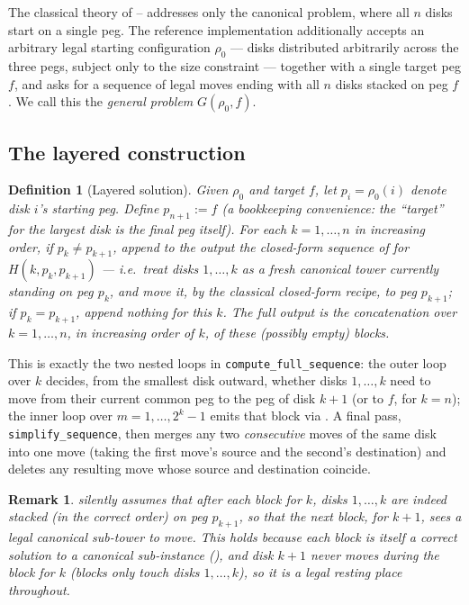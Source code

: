 \documentclass[11pt]{article}
\newtheorem{definition}[theorem]{Definition}
\newtheorem{remark}[theorem]{Remark}
\begin{document}
The classical theory of -- addresses only
the canonical problem, where all $n$ disks start on a single peg. The
reference implementation additionally accepts an arbitrary legal starting
configuration $\rho_0$ --- disks distributed arbitrarily across the three
pegs, subject only to the size constraint --- together with a single target
peg $f$, and asks for a sequence of legal moves ending with all $n$ disks
stacked on peg $f$. We call this the \emph{general problem}
$G(\rho_0, f)$.

\subsection{The layered construction}

\begin{definition}[Layered solution]
\label{def:layered}
Given $\rho_0$ and target $f$, let $p_i = \rho_0(i)$ denote disk $i$'s
starting peg. Define $p_{n+1} := f$ (a bookkeeping convenience: the
``target'' for the largest disk is the final peg itself). For each
$k = 1, \dots, n$ in increasing order, if $p_k \ne p_{k+1}$, append to the
output the closed-form sequence of  for $H(k, p_k,
p_{k+1})$ --- i.e.\ treat disks $1,\dots,k$ as a fresh canonical tower
currently standing on peg $p_k$, and move it, by the classical closed-form
recipe, to peg $p_{k+1}$; if $p_k = p_{k+1}$, append nothing for this $k$.
The full output is the concatenation over $k=1,\dots,n$, in increasing
order of $k$, of these (possibly empty) blocks.
\end{definition}

This is exactly the two nested loops in
\texttt{compute\_full\_sequence}: the outer loop over $k$ decides, from the
smallest disk outward, whether disks $1,\dots,k$ need to move from their
current common peg to the peg of disk $k+1$ (or to $f$, for $k=n$); the
inner loop over $m = 1,\dots,2^k-1$ emits that block via
. A final pass, \texttt{simplify\_sequence}, then merges
any two \emph{consecutive} moves of the same disk into one move (taking the
first move's source and the second's destination) and deletes any resulting
move whose source and destination coincide.

\begin{remark}
 silently assumes that after each block for $k$, disks
$1,\dots,k$ are indeed stacked (in the correct order) on peg $p_{k+1}$, so
that the next block, for $k+1$, sees a legal canonical sub-tower to move.
This holds because each block is itself a correct solution to a canonical
sub-instance (), and disk $k+1$ never moves during the
block for $k$ (blocks only touch disks $1,\dots,k$), so it is a legal
resting place throughout.
\end{remark}
\end{document}
